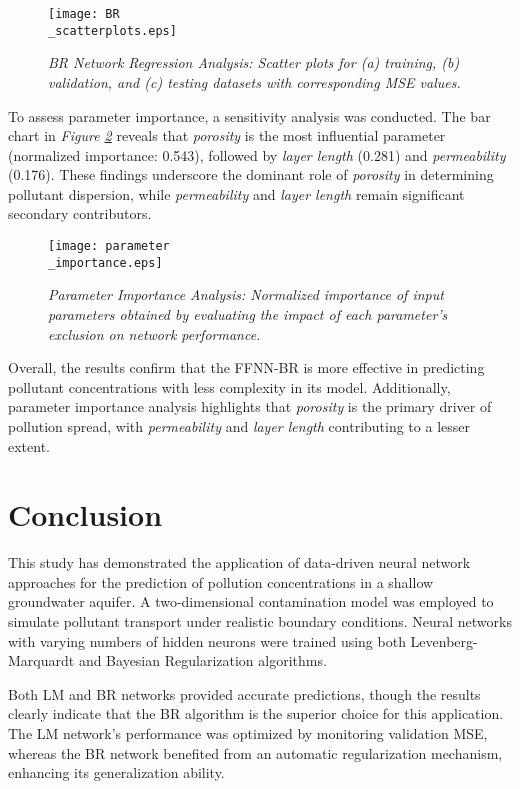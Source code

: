 \documentclass[10pt]{article}
\begin{document}
	\begin{figure}[H]
		\centering
		\texttt{[image: BR\\\_scatterplots.eps]}
		\caption{\textit{BR Network Regression Analysis: Scatter plots for (a) training, (b) validation, and (c) testing datasets with corresponding MSE values.}}
		\label{fig:br_sct}
	\end{figure}
	
	To assess parameter importance, a sensitivity analysis was conducted. The bar chart in \textit{Figure \ref{fig:param_imp}} reveals that \textit{porosity} is the most influential parameter (normalized importance: 0.543), followed by \textit{layer length} (0.281) and \textit{permeability} (0.176). These findings underscore the dominant role of \textit{porosity} in determining pollutant dispersion, while \textit{permeability} and \textit{layer length} remain significant secondary contributors.
	
	\begin{figure}[H]
		\centering
		\texttt{[image: parameter\\\_importance.eps]}
		\caption{\textit{Parameter Importance Analysis: Normalized importance of input parameters obtained by evaluating the impact of each parameter's exclusion on network performance.}}
		\label{fig:param_imp}
	\end{figure}
	
	Overall, the results confirm that the FFNN-BR is more effective in predicting pollutant concentrations with less complexity in its model. Additionally, parameter importance analysis highlights that \textit{porosity} is the primary driver of pollution spread, with \textit{permeability} and \textit{layer length} contributing to a lesser extent.
	
	\section{Conclusion}
	This study has demonstrated the application of data-driven neural network approaches for the prediction of pollution concentrations in a shallow groundwater aquifer. A two-dimensional contamination model was employed to simulate pollutant transport under realistic boundary conditions. Neural networks with varying numbers of hidden neurons were trained using both Levenberg-Marquardt and Bayesian Regularization algorithms.
	
	Both LM and BR networks provided accurate predictions, though the results clearly indicate that the BR algorithm is the superior choice for this application. The LM network’s performance was optimized by monitoring validation MSE, whereas the BR network benefited from an automatic regularization mechanism, enhancing its generalization ability.
	
\end{document}
